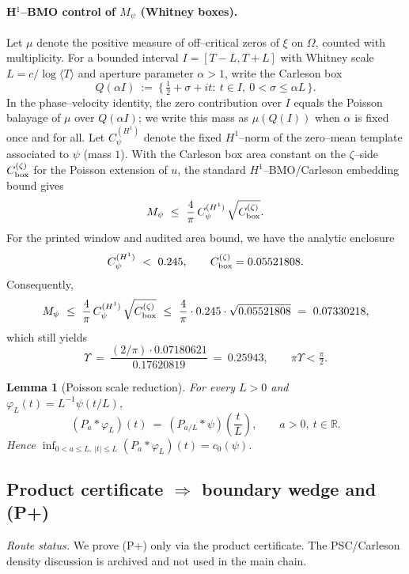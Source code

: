\documentclass[11pt]{article}
\providecommand{\Mpsilocked}{0.07180621}%
\providecommand{\UpsilonLocked}{0.25943}%
\newtheorem{lemma}[theorem]{Lemma}
\theoremstyle{definition}
\theoremstyle{remark}
\newcommand{\R}{\mathbb{R}}
\newcommand{\Poisson}{P}
\begin{document}
\paragraph{H$^1$--BMO control of $M_\psi$ (Whitney boxes).}
Let $\mu$ denote the positive measure of off–critical zeros of $\xi$ on \(\Omega\), counted with multiplicity. For a bounded interval $I=[T-L,T+L]$ with Whitney scale $L=c/\log\langle T\rangle$ and aperture parameter $\alpha>1$, write the Carleson box
\[
 Q(\alpha I)\ :=\ \{\,\tfrac12+\sigma+it:\ t\in I,\ 0<\sigma\le \alpha L\,\}.
\]
In the phase–velocity identity, the zero contribution over $I$ equals the Poisson balayage of $\mu$ over $Q(\alpha I)$; we write this mass as $\mu(Q(I))$ when $\alpha$ is fixed once and for all.
Let $C_\psi^{(H^1)}$ denote the fixed $H^1$--norm of the zero--mean template associated to $\psi$ (mass $1$).
With the Carleson box area constant on the $\zeta$--side $C_{\rm box}^{(\zeta)}$ for the Poisson extension of $u$, the standard
$H^1$--BMO/Carleson embedding bound gives
\[
 M_\psi\ \le\ \frac{4}{\pi}\,C_\psi^{(H^1)}\,\sqrt{C_{\rm box}^{(\zeta)}}.
\]
For the printed window and audited area bound, we have the analytic enclosure
\[
 C_\psi^{(H^1)}\ <\ 0.245,\qquad C_{\rm box}^{(\zeta)}= 0.05521808.
\]
Consequently,
\[
 M_\psi\ \le\ \frac{4}{\pi}\,C_\psi^{(H^1)}\,\sqrt{C_{\rm box}^{(\zeta)}}\ \le\ \frac{4}{\pi}\cdot 0.245\cdot \sqrt{0.05521808}\ =\ 0.07330218,
\]
which still yields
\[
 \Upsilon\ =\ \frac{(2/\pi)\cdot \Mpsilocked}{0.17620819}\ =\ \UpsilonLocked,\qquad \pi\Upsilon<\tfrac{\pi}{2}.
\]

\begin{lemma}[Poisson scale reduction]\label{lem:poisson-scale-stage2}
For every $L>0$ and $\varphi_L(t)=L^{-1}\psi(t/L)$,
\[
 (\Poisson_a*\varphi_L)(t)\ =\ (\Poisson_{a/L}*\psi)\!\left(\frac{t}{L}\right),\qquad a>0,\ t\in\R.
\]
Hence $\inf_{0<a\le L,\ |t|\le L}(\Poisson_a*\varphi_L)(t)=c_0(\psi)$.
\end{lemma}

\subsection*{Product certificate $\Rightarrow$ boundary wedge and (P+)}
\noindent\textit{Route status.} We prove (P+) only via the product certificate. The PSC/Carleson density discussion is archived and not used in the main chain.
\end{document}
